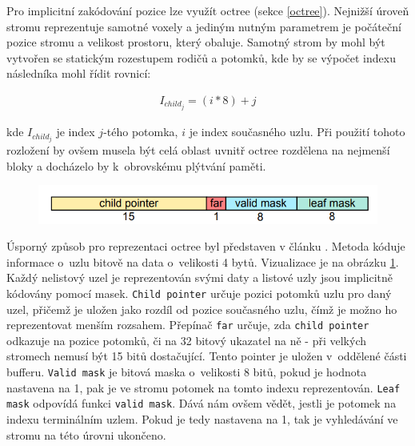 Pro implicitní zakódování pozice lze využít octree (sekce \ref{octree}). Nejnižší úroveň stromu reprezentuje samotné voxely a jediným nutným parametrem je počáteční pozice stromu a velikost prostoru, který obaluje. Samotný strom by mohl být vytvořen se statickým rozestupem rodičů a potomků, kde by se výpočet indexu následníka mohl řídit rovnicí:

\begin{equation} \label{eq:simple_octree_index}
	\begin{gathered}
		I_{child_j} = (i * 8) + j
	\end{gathered}
\end{equation}

kde $I_{child_j}$ je index $j$-tého potomka, $i$ je index současného uzlu. Při použití tohoto rozložení by ovšem musela být celá oblast uvnitř octree rozdělena na nejmenší bloky a docházelo by k~obrovskému plýtvání paměti.

\begin{figure}[H]
	\centering
	\includegraphics[scale=1.7]{obrazky-figures/octree_child_data.png}
	\captionsetup{justification=centering}
	\label{fig:octree_child}
\end{figure}

Úsporný způsob pro reprezentaci octree byl představen v článku \cite{Laine2011EfficientSV}. Metoda kóduje informace o~uzlu bitově na data o~velikosti 4 bytů. Vizualizace je na obrázku \ref{fig:octree_child}. Každý nelistový uzel je reprezentován svými daty a listové uzly jsou implicitně kódovány pomocí masek. \texttt{Child pointer} určuje pozici potomků uzlu pro daný uzel, přičemž je uložen jako rozdíl od pozice současného uzlu, čímž je možno ho reprezentovat menším rozsahem. Přepínač \texttt{far} určuje, zda \texttt{child pointer} odkazuje na pozice potomků, či na 32 bitový ukazatel na ně - při velkých stromech nemusí být 15 bitů dostačující. Tento pointer je uložen v~oddělené části bufferu. \texttt{Valid mask} je bitová maska o~velikosti 8 bitů, pokud je hodnota nastavena na 1, pak je ve stromu potomek na tomto indexu reprezentován. \texttt{Leaf mask} odpovídá funkci \texttt{valid mask}. Dává nám ovšem vědět, jestli je potomek na indexu terminálním uzlem. Pokud je tedy nastavena na 1, tak je vyhledávání ve stromu na této úrovni ukončeno.

